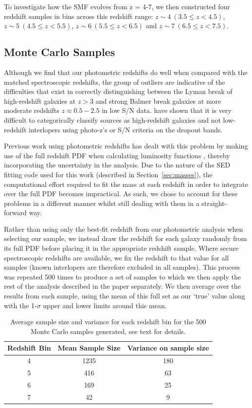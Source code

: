 To investigate how the SMF evolves from z = 4-7, we then constructed four redshift samples in bins across this redshift range: $z \sim 4 ~(3.5 \leq z < 4.5)$, $z \sim 5~ (4.5 \leq z < 5.5)$, $z \sim 6~(5.5 \leq z < 6.5)$ and $z \sim 7 ~(6.5 \leq z < 7.5)$.

\subsection{Monte Carlo Samples}\label{sec:MC}
Although we find that our photometric redshifts do well when compared with the matched spectroscopic redshifts, the group of outliers are indicative of the difficulties that exist in correctly distinguishing between the Lyman break of high-redshift galaxies at $z > 3$ and strong Balmer break galaxies at more moderate redshifts $z \approx 0.5-2.5$ in low S/N data. \citet{2012ApJ...748..122P,Pirzkal:2013ug} have shown that it is very difficult to categorically classify sources as high-redshift galaxies and not low-redshift interlopers using photo-z's or S/N criteria on the dropout bands.

Previous work using photometric redshifts has dealt with this problem by making use of the full redshift PDF when calculating luminosity functions \citep{2005ApJ...631..126D,2009MNRAS.395.2196M,McLure:2013hh}, thereby incorporating the uncertainty in the analysis. Due to the nature of the SED fitting code used for this work (described in Section~\ref{sec:masses}), the computational effort required to fit the mass at each redshift in order to integrate over the full PDF becomes impractical. As such, we chose to account for these problems in a different manner whilst still dealing with them in a straight-forward way. 

Rather than using only the best-fit redshift from our photometric analysis when selecting our sample, we instead draw the redshift for each galaxy randomly from its full PDF before placing it in the appropriate redshift sample. Where secure spectroscopic redshifts are available, we fix the redshift to that value for all samples (known interlopers are therefore excluded in all samples). This process was repeated 500 times to produce a set of samples to which we then apply the rest of the analysis described in the paper separately. We then average over the results from each sample, using the mean of this full set as our `true' value along with the 1-$\sigma$ upper and lower limits around this mean. 

\begin{table}
\centering
\caption[Short caption]{Average sample size and variance for each redshift bin for the 500 Monte Carlo samples generated, see text for details.}
\label{tab:samplesizes}
\begin{tabular}{@{}ccc}
\hline
 Redshift Bin & Mean Sample Size & Variance on sample size  \\
  \hline
 4 & 1235 & 180 \\
 5 & 416 & 63 \\
 6 & 169 & 25 \\
 7 & 42 & 9 \\
 \hline
\end{tabular}
\end{table}

